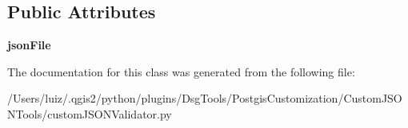 \subsection*{Public Attributes}
\begin{DoxyCompactItemize}
\item 
\mbox{\label{class_dsg_tools_1_1_postgis_customization_1_1_custom_j_s_o_n_tools_1_1custom_j_s_o_n_validator_1_1_custom_j_s_o_n_validator_a8f61b2ae0aed6a6e60803463cdf57809}} 
{\bfseries json\+File}
\end{DoxyCompactItemize}


The documentation for this class was generated from the following file\+:\begin{DoxyCompactItemize}
\item 
/\+Users/luiz/.\+qgis2/python/plugins/\+Dsg\+Tools/\+Postgis\+Customization/\+Custom\+J\+S\+O\+N\+Tools/custom\+J\+S\+O\+N\+Validator.\+py\end{DoxyCompactItemize}
